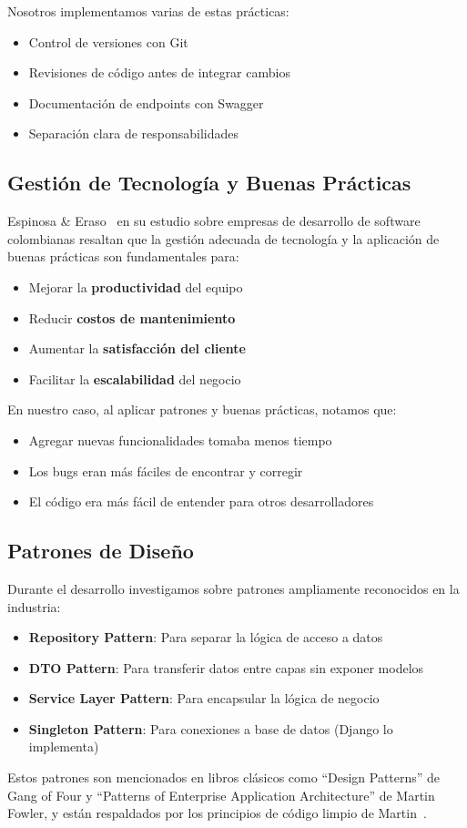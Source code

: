 Nosotros implementamos varias de estas prácticas:
\begin{itemize}
    \item Control de versiones con Git
    \item Revisiones de código antes de integrar cambios
    \item Documentación de endpoints con Swagger
    \item Separación clara de responsabilidades
\end{itemize}

\subsection{Gestión de Tecnología y Buenas Prácticas}

Espinosa \& Eraso~\cite{espinosa2024gestion} en su estudio sobre empresas de desarrollo de software colombianas resaltan que la gestión adecuada de tecnología y la aplicación de buenas prácticas son fundamentales para:

\begin{itemize}
    \item Mejorar la \textbf{productividad} del equipo
    \item Reducir \textbf{costos de mantenimiento}
    \item Aumentar la \textbf{satisfacción del cliente}
    \item Facilitar la \textbf{escalabilidad} del negocio
\end{itemize}

En nuestro caso, al aplicar patrones y buenas prácticas, notamos que:
\begin{itemize}
    \item Agregar nuevas funcionalidades tomaba menos tiempo
    \item Los bugs eran más fáciles de encontrar y corregir
    \item El código era más fácil de entender para otros desarrolladores
\end{itemize}

\subsection{Patrones de Diseño}

Durante el desarrollo investigamos sobre patrones ampliamente reconocidos en la industria:

\begin{itemize}
    \item \textbf{Repository Pattern}: Para separar la lógica de acceso a datos
    \item \textbf{DTO Pattern}: Para transferir datos entre capas sin exponer modelos
    \item \textbf{Service Layer Pattern}: Para encapsular la lógica de negocio
    \item \textbf{Singleton Pattern}: Para conexiones a base de datos (Django lo implementa)
\end{itemize}

Estos patrones son mencionados en libros clásicos como ``Design Patterns'' de Gang of Four y ``Patterns of Enterprise Application Architecture'' de Martin Fowler, y están respaldados por los principios de código limpio de Martin~\cite{martin2008clean}.